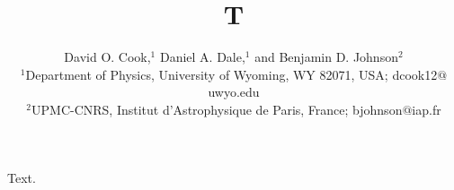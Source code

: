 \documentclass{mn2e}
\begin{document}
\title{T}
\author[D. Cook et al.]{David O. Cook,$^1$ Daniel A. Dale,$^1$ and Benjamin D. Johnson$^2$\\
$^1$Department of Physics, University of Wyoming, WY 82071, USA; dcook12$@$uwyo.edu\\
$^2$UPMC-CNRS, Institut d'Astrophysique de Paris, France; bjohnson$@$iap.fr}
\maketitle
Text.
\end{document}
